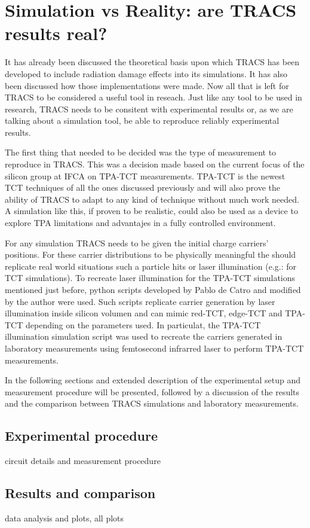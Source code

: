 \chapter{Simulation vs Reality: are TRACS results real?}

It has already been discussed the theoretical basis upon which TRACS has been developed to include radiation damage effects into its simulations. It has also been discussed how those implementations were made. Now all that is left for TRACS to be considered a useful tool in reseach. Just like any tool to be used in research, TRACS needs to be consitent with experimental results or, as we are talking about a simulation tool, be able to reproduce reliably experimental results.

The first thing that needed to be decided was the type of measurement to reproduce in TRACS. This was a decision made based on the current focus of the silicon group at IFCA \iffalse No se el nombre oficial \fi on TPA-TCT measurements. TPA-TCT is the newest TCT techniques of all the ones discussed previously and will also prove the ability of TRACS to adapt to any kind of technique without much work needed. A simulation like this, if proven to be realistic, could also be used as a device to explore TPA limitations and advantajes in a fully controlled environment.

For any simulation TRACS needs to be given the initial charge carriers' positions. For these carrier distributions to be physically meaningful the should replicate real world situations such a particle hits or laser illumination (e.g.: for TCT simulations). To recreate laser illumination for the TPA-TCT simulations mentioned just before, python scripts developed by Pablo de Catro and modified by the author were used. Such scripts replicate carrier generation by laser illumination inside silicon volumen and can mimic red-TCT, edge-TCT and TPA-TCT depending on the parameters used. In particulat, the TPA-TCT illumination simulation script was used to recreate the carriers generated in laboratory measurements using femtosecond infrarred laser to perform TPA-TCT measurements.

In the following sections and extended description of the experimental setup and  measurement procedure will be presented, followed by a discussion of the results and the comparison between TRACS simulations and laboratory measurements.


\section{Experimental procedure} %
\label{sec:future_improvements}

circuit details and measurement procedure


\section{Results and comparison} %
\label{sec:future_proyection}

data analysis and plots, all plots 


